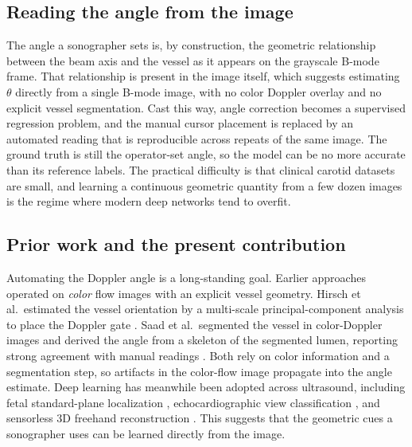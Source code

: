 \subsection{Reading the angle from the image}
\label{sec:intro:idea}

The angle a sonographer sets is, by construction, the geometric relationship
between the beam axis and the vessel as it appears on the grayscale B-mode frame.
That relationship is present in the image itself, which suggests estimating
$\theta$ directly from a single B-mode image, with no color Doppler overlay and
no explicit vessel segmentation. Cast this way, angle correction becomes a
supervised regression problem, and the manual cursor placement is replaced by an
automated reading that is reproducible across repeats of the same image. The
ground truth is still the operator-set angle, so the model can be no more accurate
than its reference labels. The practical difficulty is that clinical carotid
datasets are small, and learning a continuous geometric quantity from a few dozen
images is the regime where modern deep networks tend to overfit.

\subsection{Prior work and the present contribution}
\label{sec:intro:prior}

Automating the Doppler angle is a long-standing goal. Earlier approaches operated
on \emph{color} flow images with an explicit vessel geometry. Hirsch et al.\
estimated the vessel orientation by a multi-scale principal-component analysis to
place the Doppler gate \citep{Hirsch2006}. Saad et al.\ segmented the vessel in
color-Doppler images and derived the angle from a skeleton of the segmented lumen,
reporting strong agreement with manual readings \citep{Saad2008}. Both rely on
color information and a segmentation step, so artifacts in the color-flow image
propagate into the angle estimate. Deep learning has meanwhile been adopted across
ultrasound, including fetal standard-plane localization \citep{Chen2015},
echocardiographic view classification \citep{Madani2018}, and sensorless 3D
freehand reconstruction \citep{Prevost2018}. This suggests that the geometric cues
a sonographer uses can be learned directly from the image.


